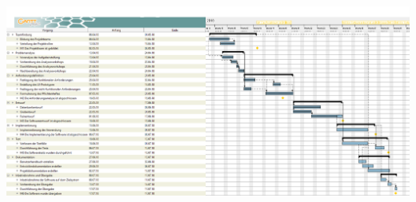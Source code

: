 \documentclass{scrartcl}
\begin{document}
\includegraphics[width=\textwidth]{Bilder/projektablaufplan}
\\
\\
\\
\end{document}

